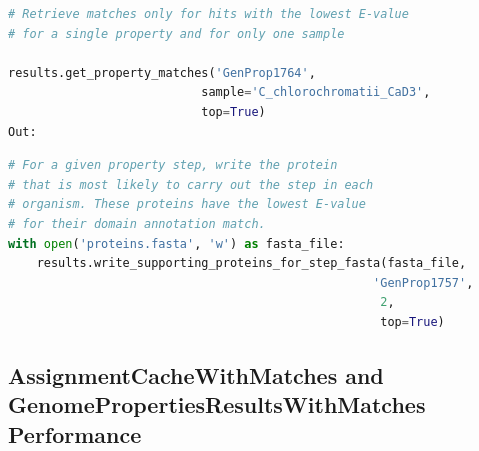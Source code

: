 \begin{lstlisting}[language=Python]  
# Retrieve matches only for hits with the lowest E-value 
# for a single property and for only one sample                                  
   
results.get_property_matches('GenProp1764', 
                           sample='C_chlorochromatii_CaD3',
                           top=True)
Out:
\end{lstlisting}

\begin{table}[!ht]
\centering
{}
\end{table}

\begin{lstlisting}[language=Python]  
# For a given property step, write the protein 
# that is most likely to carry out the step in each 
# organism. These proteins have the lowest E-value
# for their domain annotation match.                                 
with open('proteins.fasta', 'w') as fasta_file:
    results.write_supporting_proteins_for_step_fasta(fasta_file, 
                                                   'GenProp1757', 
                                                    2, 
                                                    top=True)
\end{lstlisting}

\subsection{AssignmentCacheWithMatches and GenomePropertiesResultsWithMatches 
Performance} \label{matches-performance}

